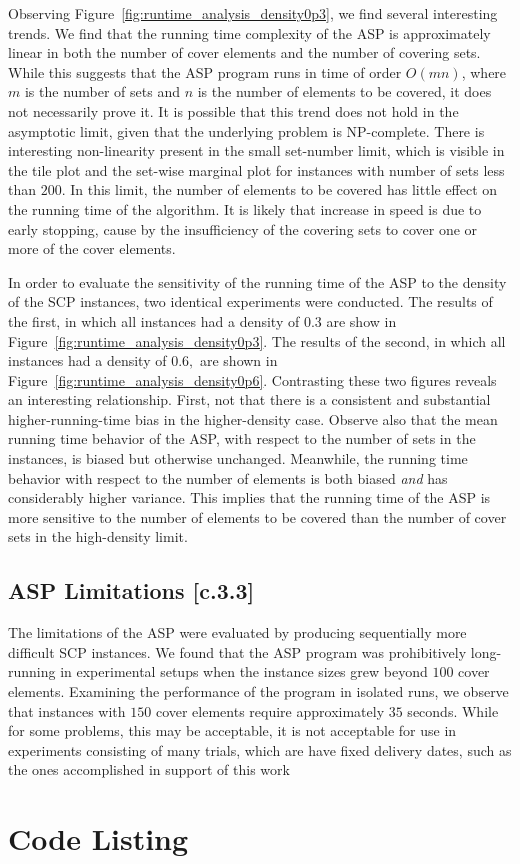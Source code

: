 \documentclass[12pt]{article}
\begin{document}
Observing Figure~\ref{fig:runtime_analysis_density0p3}, we find several interesting trends. We find that the running time complexity of the ASP is approximately linear in both the number of cover elements and the number of covering sets. While this suggests that the ASP program runs in time of order $O(mn)$, where $m$ is the number of sets and $n$ is the number of elements to be covered, it does not necessarily prove it. It is possible that this trend does not hold in the asymptotic limit, given that the underlying problem is NP-complete. 
There is interesting non-linearity present in the small set-number limit, which is visible in the tile plot and the set-wise marginal plot for instances with number of sets less than $200$. In this limit, the number of elements to be covered has little effect on the running time of the algorithm. It is likely that increase in speed is due to early stopping, cause by the insufficiency of the covering sets to cover one or more of the cover elements.

In order to evaluate the sensitivity of the running time of the ASP to the density of the SCP instances, two identical experiments were conducted. The results of the first, in which all instances had a density of $0.3$ are show in Figure~\ref{fig:runtime_analysis_density0p3}. The results of the second, in which all instances had a density of $0.6,$ are shown in Figure~\ref{fig:runtime_analysis_density0p6}. Contrasting these two figures reveals an interesting relationship. First, not that there is a consistent and substantial higher-running-time bias in the higher-density case. Observe also that the mean running time behavior of the ASP, with respect to the number of sets in the instances, is biased but otherwise unchanged. Meanwhile, the running time behavior with respect to the number of elements is both biased \emph{and} has considerably higher variance. This implies that the running time of the ASP is more sensitive to the number of elements to be covered than the number of cover sets in the high-density limit. 

\subsection{ASP Limitations [c.3.3]} \label{scn:testing_limitations}

The limitations of the ASP were evaluated by producing sequentially more difficult SCP instances. We found that the ASP program was prohibitively long-running in experimental setups when the instance sizes grew beyond $100$ cover elements. Examining the performance of the program in isolated runs, we observe that instances with $150$ cover elements require approximately $35$ seconds. While for some problems, this may be acceptable, it is not acceptable for use in experiments consisting of many trials, which are have fixed delivery dates, such as the ones accomplished in support of this work


\pagebreak
\appendix		%
	
\section{Code Listing}



\end{document}
